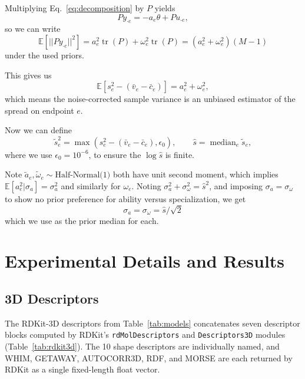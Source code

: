 \documentclass{article}
\DeclareMathOperator{\tr}{tr}
\begin{document}
Multiplying Eq.~\ref{eq:decomposition} by $P$ yields
\begin{equation}
    Py_{\cdot e} = -a_e\theta + Pu_{\cdot e},
\end{equation}
so we can write
\begin{equation}
    \mathbb{E}[||Py_{\cdot e}||^2] = a_e^2\tr(P) + \omega_e^2 \tr(P) = (a_e^2 + \omega_e^2)(M-1)
\end{equation}
under the used priors.

This gives us
\begin{equation}
    \mathbb{E}[s_e^2 - (\bar{v}_e - \bar{c}_e)] = a_e^2 + \omega_e^2,
\end{equation}
which means the noise-corrected sample variance is an unbiased estimator of the spread on endpoint $e$.

Now we can define
\begin{equation}
    \tilde{s}_e^2 = \max(s_e^2 - (\bar{v}_e - \bar{c}_e), \epsilon_0), \qquad \hat{s} = \operatorname{median}_e \tilde{s}_e,
\end{equation}
where we use $\epsilon_0 = 10^{-6}$, to ensure the $\log \hat{s}$ is finite.

Note $\tilde{a}_e, \tilde{\omega}_e \sim \text{Half-Normal(1)}$ both have unit second moment, which implies $\mathbb{E}[a_e^2|\sigma_a]=\sigma_a^2$ and similarly for $\omega_e$. Noting $\sigma_a^2 + \sigma_\omega^2 = \hat{s}^2$, and imposing $\sigma_a = \sigma_\omega$ to show no prior preference for ability versus specialization, we get
\begin{equation}
    \sigma_a = \sigma_\omega = \hat{s}/\sqrt{2}
\end{equation}
which we use as the prior median for each.

\section{Experimental Details and Results}

\subsection{3D Descriptors}
\label{app:descriptors}


The RDKit-3D descriptors from Table~\ref{tab:models} concatenates seven descriptor blocks computed by RDKit's \texttt{rdMolDescriptors} and \texttt{Descriptors3D} modules \citep{rdkit} (Table~\ref{tab:rdkit3d}). The 10 shape descriptors are individually named, and WHIM, GETAWAY, AUTOCORR3D, RDF, and MORSE are each returned by RDKit as a single fixed-length float vector.
\end{document}
